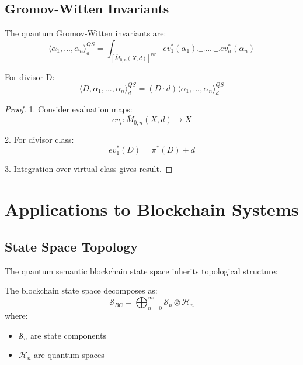 \documentclass[12pt]{article}
\begin{document}
\subsection{Gromov-Witten Invariants}

\begin{definition}
The quantum Gromov-Witten invariants are:
\begin{equation}
⟨α_1,...,α_n⟩_{d}^{QS} = \int_{[\overline{M}_{0,n}(X,d)]^{vir}} ev_1^*(α_1) \smile ... \smile ev_n^*(α_n)
\end{equation}
\end{definition}

\begin{theorem}
For divisor D:
\begin{equation}
⟨D,α_1,...,α_n⟩_{d}^{QS} = (D · d)⟨α_1,...,α_n⟩_{d}^{QS}
\end{equation}
\end{theorem}

\begin{proof}
1. Consider evaluation maps:
\begin{equation}
ev_i: \overline{M}_{0,n}(X,d) \rightarrow X
\end{equation}

2. For divisor class:
\begin{equation}
ev_1^*(D) = π^*(D) + d
\end{equation}

3. Integration over virtual class gives result.
\end{proof}

\section{Applications to Blockchain Systems}

\subsection{State Space Topology}

The quantum semantic blockchain state space inherits topological structure:

\begin{theorem}
The blockchain state space decomposes as:
\begin{equation}
\mathcal{S}_{BC} = \bigoplus_{n=0}^{\infty} \mathcal{S}_n \otimes \mathcal{H}_n
\end{equation}
where:
\begin{itemize}
\item $\mathcal{S}_n$ are state components
\item $\mathcal{H}_n$ are quantum spaces
\end{itemize}
\end{theorem}
\end{document}
